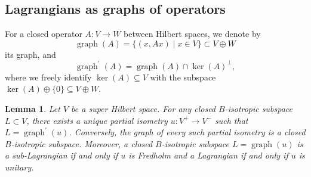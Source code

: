 \documentclass[pdftex]{sigma}
\numberwithin{equation}{section}
\newtheorem{Lemma}[Theorem]{Lemma}
\DeclareMathOperator{\graph}{\mathrm{graph}}
\begin{document}
\subsection{Lagrangians as graphs of operators}
\label{SectionLagrangianGraph}

For a closed operator $A \colon V \to W$ between Hilbert spaces, we denote by \[\graph(A) = \{(x, Ax) \mid x \in V\} \subset V \oplus W\] its graph, and
\begin{equation*}
\graph^\prime(A) = \graph(A) \cap \ker(A)^\perp,
\end{equation*}
where we freely identify $\ker(A) \subseteq V$ with the subspace $\ker(A) \oplus\{0\} \subseteq V \oplus W$.

\begin{Lemma} \label{LemmaLagrangianCorrespondence}
Let $V$ be a super Hilbert space.
For any closed $B$-isotropic subspace $L \subset V$, there exists a unique partial isometry $u\colon V^+ \to V^-$ such that $L = \graph^\prime(u)$.
Conversely, the graph of every such partial isometry is a closed $B$-isotropic subspace.
Moreover, a closed $B$-isotropic subspace $L = \graph(u)$ is a sub-Lagrangian if and only if $u$ is Fredholm and a Lagrangian if and only if $u$ is unitary.
\end{Lemma}
\end{document}
